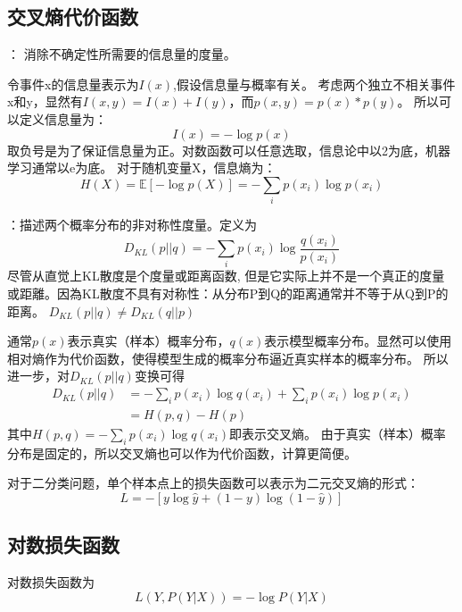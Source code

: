 \subsection{交叉熵代价函数}
{}： 消除不确定性所需要的信息量的度量。

令事件x的信息量表示为$I(x)$,假设信息量与概率有关。
考虑两个独立不相关事件x和y，显然有$I(x,y) = I(x)+I(y)$，而$p(x,y)=p(x)*p(y)$。
所以可以定义信息量为：
\begin{equation*}
    I(x) = -\log p(x)
\end{equation*}
取负号是为了保证信息量为正。对数函数可以任意选取，信息论中以2为底，机器学习通常以e为底。
对于随机变量X，信息熵为：
\begin{equation*}
    H(X) = \mathbb{E}[-\log p(X)] = - \sum_i p(x_i) \log p(x_i)
\end{equation*}

{}：描述两个概率分布的非对称性度量。定义为
\begin{equation*}
    D_{KL}(p||q) = -\sum_i p(x_i) \log \frac{q(x_i)}{p(x_i)}
\end{equation*}
{\color{red}尽管从直觉上KL散度是个度量或距离函数, 但是它实际上并不是一个真正的度量或距離。因為KL散度不具有对称性：从分布P到Q的距离通常并不等于从Q到P的距离。
$D_{KL}(p||q) \neq D_{KL}(q||p)$} 

通常$p(x)$表示真实（样本）概率分布，$q(x)$表示模型概率分布。显然可以使用相对熵作为代价函数，使得模型生成的概率分布逼近真实样本的概率分布。
所以进一步，对$D_{KL}(p||q)$变换可得
\begin{align*}
    D_{KL}(p||q) &= -\sum_i p(x_i) \log q(x_i) + \sum_i p(x_i) \log p(x_i) \\
    &= H(p,q) - H(p)
\end{align*}
其中$H(p,q) = -\sum_i p(x_i) \log q(x_i)$即表示交叉熵。
由于真实（样本）概率分布是固定的，所以交叉熵也可以作为代价函数，计算更简便。

对于二分类问题，单个样本点上的损失函数可以表示为二元交叉熵的形式：
\begin{equation*}
    L = -[y\log \hat{y} + (1-y)\log (1-\hat{y})]
\end{equation*}

\subsection{对数损失函数}
对数损失函数为
\begin{equation*}
    L(Y, P(Y|X)) = -\log P(Y|X)
\end{equation*}

